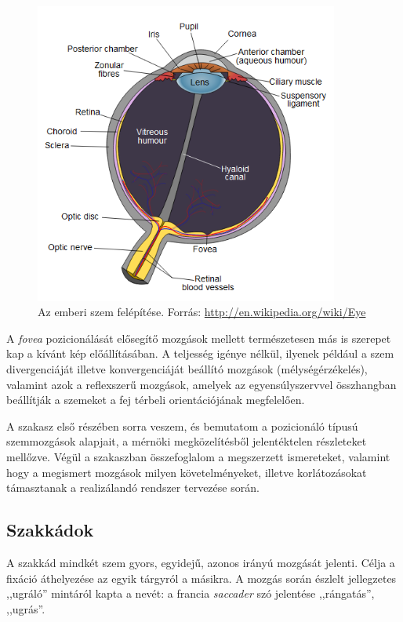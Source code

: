 \begin{figure}[!ht]
\centering
\includegraphics[width=100mm, keepaspectratio]{figures/eye_diagram.png}
\caption{Az emberi szem felépítése. Forrás: \url{http://en.wikipedia.org/wiki/Eye}}
\label{fig:eyediag}
\end{figure}

A \emph{fovea} pozicionálását elősegítő mozgások mellett természetesen más is szerepet kap a kívánt kép előállításában. A teljesség igénye nélkül, ilyenek például a szem divergenciáját illetve konvergenciáját beállító mozgások (mélységérzékelés), valamint azok a reflexszerű mozgások, amelyek az egyensúlyszervvel összhangban beállítják a szemeket a fej térbeli orientációjának megfelelően.

\bigskip

A szakasz első részében sorra veszem, és bemutatom a pozicionáló típusú szemmozgások alapjait, a mérnöki megközelítésből jelentéktelen részleteket mellőzve. Végül a  szakaszban összefoglalom a megszerzett ismereteket, valamint hogy a megismert mozgások milyen követelményeket, illetve korlátozásokat támasztanak a realizálandó rendszer tervezése során.

\subsection{Szakkádok}\label{sect:szakkadok}

A szakkád mindkét szem gyors, egyidejű, azonos irányú mozgását jelenti. Célja a fixáció áthelyezése az egyik tárgyról a másikra. A mozgás során észlelt jellegzetes ,,ugráló'' mintáról kapta a nevét: a francia \emph{saccader} szó jelentése ,,rángatás'', ,,ugrás''.

